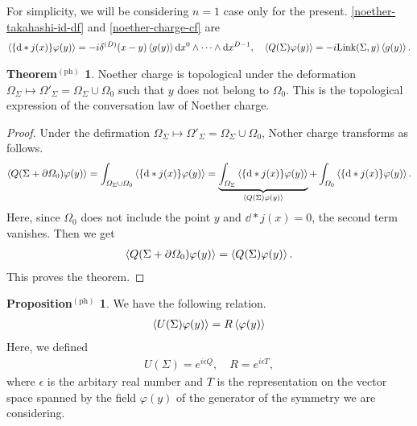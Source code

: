 \documentclass{article}
\theoremstyle{definition}
\newtheorem{theoremph}{Theorem$^\mathrm{(ph)}$}[section]
\newtheorem{propositionph}{Proposition$^\mathrm{(ph)}$}[section]
\numberwithin{equation}{section}
\renewcommand{\mapsto}{\longmapsto}
\newcommand{\link}{\mathrm{Link}}
\begin{document}
For simplicity, we will be considering $n = 1$ case only for the present. \eqref{noether-takahashi-id-df} and \eqref{noether-charge-cf} are
\begin{align}
  \ev{\qty{\dd * j(x)} \varphi(y)} = -i \delta^{(D)}(x - y) \ev{g(y)} \dd x^0 \wedge \cdots \wedge \dd x^{D-1}, \quad\ev{Q(\Sigma) \varphi(y)} = -i \link(\Sigma, y) \ev{g(y)}.
\end{align}

\begin{theoremph}
  Noether charge is topological under the deformation $\varOmega_\Sigma \mapsto \varOmega'_\Sigma = \varOmega_\Sigma \cup \varOmega_0$ such that $y$ does not belong to $\varOmega_0$. This is the topological expression of the conversation law of Noether charge.
\end{theoremph}

\begin{proof}
  Under the defirmation $\varOmega_\Sigma \mapsto \varOmega'_\Sigma = \varOmega_\Sigma \cup \varOmega_0$, Nother charge transforms as follows.
  \begin{align}
    \ev{Q(\Sigma + \partial \varOmega_0)\varphi(y)}= \int_{\varOmega_\Sigma \cup \varOmega_0} \ev{\qty{\dd * j(x)}\varphi(y)}
    = \underbrace{\int_{\varOmega_\Sigma} \ev{\qty{\dd * j(x)} \varphi(y)}}_{\ev{Q(\Sigma)\varphi(y)}} + \int_{\varOmega_0} \ev{\qty{\dd * j(x)} \varphi(y)}.
  \end{align}
  Here, since $\varOmega_0$ does not include the point $y$ and $\dd * j(x) = 0$, the second term vanishes. Then we get
  \begin{align}
    \ev{Q(\Sigma + \partial \varOmega_0) \varphi(y)} = \ev{Q(\Sigma)\varphi(y)}.
  \end{align}
  This proves the theorem.
\end{proof}

\begin{propositionph}
  We have the following relation.
  \begin{align}
    \ev{U(\Sigma)\varphi(y)} = R \ev{\varphi(y)}
  \end{align}
  Here, we defined
  \begin{align}
    U(\Sigma) = e^{i\epsilon Q}, \quad R = e^{i\epsilon T},
  \end{align}
  where $\epsilon$ is the arbitary real number and $T$ is the representation on the vector space spanned by the field $\varphi(y)$ of the generator of the symmetry we are considering.
\end{propositionph}
\end{document}
